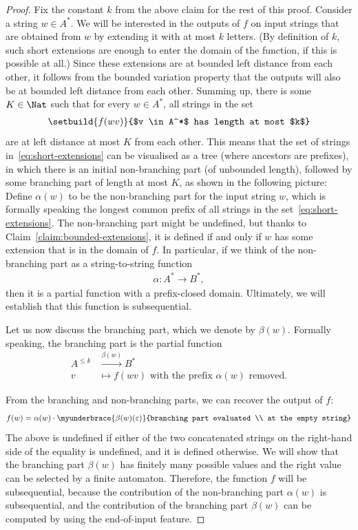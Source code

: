 \begin{proof}
   Fix the constant $k$ from the above claim for the rest of this proof.
   Consider a string $w \in A^*$. We will be interested in the outputs of $f$ on input strings that are obtained from $w$ by extending it with  at most $k$ letters. (By definition of $k$, such short extensions are enough to enter the domain of the function, if this is possible at all.) Since these extensions are at bounded left distance from each other, it follows from the bounded variation property that the outputs will also be at bounded left distance from each other. Summing up, there is some $K \in \Nat$ such that for every $w \in A^*$, all strings in the set  
   \begin{align}
    \label{eq:short-extensions}
   \setbuild{ f(wv)}{$v \in A^*$ has length at most $k$}
   \end{align}
   are at left distance at most $K$ from each other. This means that the set of strings in~\eqref{eq:short-extensions} can be visualised as a tree (where ancestors are prefixes), in which there is an initial non-branching part  (of unbounded length), followed by some branching part of length at most $K$, as shown in the following picture:
   Define $\alpha(w)$ to be the non-branching part for the input string $w$, which is formally speaking the longest common prefix of all strings in the set~\eqref{eq:short-extensions}. The non-branching part might be undefined, but thanks to Claim~\ref{claim:bounded-extensions}, it is defined if and only if $w$ has some extension that is in the domain of $f$. In particular, if we think of the non-branching part as a string-to-string function
   \begin{align*}
   \alpha : A^* \to B^*,
   \end{align*}
   then it is a partial function with a prefix-closed domain. Ultimately, we will establish that this function is subsequential. 
   
   Let us now discuss the branching part, which we denote by  $\beta(w)$. Formally speaking, the branching part is the partial function 
   \begin{align*}
    A^{\le k} & \xrightarrow{\beta(w)} B^* \\
    v & \mapsto f(wv) \text{ with the prefix $\alpha(w)$ removed.}
   \end{align*}

From the branching and non-branching parts, we can recover the output of $f$: 
\begin{align}\label{eq:f-from-alpha-beta}
f(w) = \alpha(w) \cdot \myunderbrace{\beta(w)(\varepsilon)}{branching part evaluated \\ at the empty string}
\end{align}
The above is undefined if either of the two concatenated strings on the right-hand side of the equality is undefined, and it is defined otherwise.
 We will show that  the branching part $\beta(w)$ has finitely many possible values and the right value can be selected by a finite automaton. Therefore, the function $f$ will be subsequential, because the contribution of the non-branching part $\alpha(w)$ is subsequential, and the contribution of the branching part $\beta(w)$ can be computed by using the end-of-input feature.


\end{proof}
